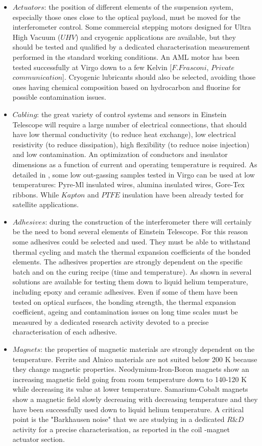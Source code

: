\begin{itemize}
\item $Actuators$: the position of different elements of the suspension system, especially those ones close to the optical payload, must be moved for the interferometer control. Some commercial stepping motors designed for Ultra High Vacuum ($UHV$) and cryogenic applications are available, but they should be tested and qualified by a dedicated characterisation measurement performed in the standard working conditions. An AML motor has been tested successfully at Virgo down to a few Kelvin [$F. Frasconi$, $Private$ $communication$]. Cryogenic lubricants should also be selected, avoiding those ones having chemical composition based on hydrocarbon and fluorine for possible contamination issues.
\item $Cabling$: the great variety of control systems and sensors in Einstein Telescope will require a large number of electrical connections, that should have low thermal conductivity (to reduce heat exchange), low electrical resistivity (to reduce dissipation), high flexibility (to reduce noise injection) and low contamination. An optimization of conductors and insulator dimensions as a function of current and operating temperature is required. As detailed in \cite{Poggiani2009}, some low out-gassing samples tested in Virgo can be used at low temperatures: Pyre-Ml insulated wires, alumina insulated wires, Gore-Tex ribbons. While $Kapton$ and $PTFE$ insulation have been already tested for satellite applications.
\item $Adhesives$: during the construction of the interferometer there will certainly be the need to bond several elements of Einstein Telescope. For this reason some adhesives could be selected and used. They must be able to withstand thermal cycling and match the thermal expansion coefficients of the bonded elements. The adhesives properties are strongly dependent on the specific batch and on the curing recipe (time and temperature). As shown in \cite{Poggiani2009} several solutions are available for testing them down to liquid helium temperature, including epoxy and ceramic adhesives. Even if some of them have been tested on optical surfaces, the bonding strength, the thermal expansion coefficient, ageing and contamination issues on long time scales must be measured by a dedicated research activity devoted to a precise characterisation of each adhesive.
\item $Magnets$: the properties of magnetic materials are strongly dependent on the temperature. Ferrite and Alnico materials are not suited below 200 K because they change magnetic properties. Neodymium-Iron-Boron magnets show an increasing magnetic field going from room temperature down to 140-120 K while decreasing its value at lower temperature. Samarium-Cobalt magnets show a magnetic field slowly decreasing with decreasing temperature and they have been successfully used down to liquid helium temperature. A critical point is the "Barkhausen noise" that we are studying in a dedicated $R\&D$ activity for a precise characterisation, as reported in the coil -magnet actuator section. 
\end{itemize}
